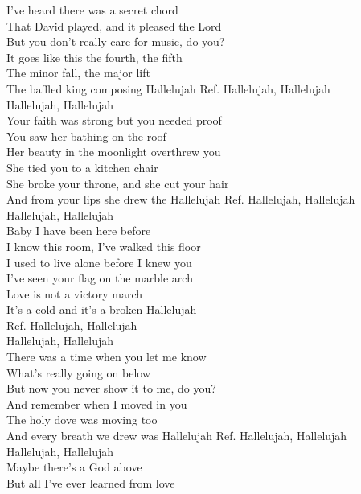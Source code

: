 
I've heard there was a secret chord\\
That David played, and it pleased the Lord\\
But you don't really care for music, do you?\\
It goes like this the fourth, the fifth\\
The minor fall, the major lift\\
The baffled king composing Hallelujah
\hops
Ref. Hallelujah, Hallelujah\\
 Hallelujah, Hallelujah\\
\hops
Your faith was strong but you needed proof\\
You saw her bathing on the roof\\
Her beauty in the moonlight overthrew you\\
She tied you to a kitchen chair\\
She broke your throne, and she cut your hair\\
And from your lips she drew the Hallelujah
\hops
Ref. Hallelujah, Hallelujah\\
 Hallelujah, Hallelujah\\
\hops
Baby I have been here before\\
I know this room, I've walked this floor\\
I used to live alone before I knew you\\
I've seen your flag on the marble arch\\
Love is not a victory march\\
It's a cold and it's a broken Hallelujah\\
\hops
Ref. Hallelujah, Hallelujah\\
 Hallelujah, Hallelujah\\
\hops
There was a time when you let me know\\
What's really going on below\\
But now you never show it to me, do you?\\
And remember when I moved in you\\
The holy dove was moving too\\
And every breath we drew was Hallelujah
\hops
Ref. Hallelujah, Hallelujah\\
 Hallelujah, Hallelujah\\
\hops
Maybe there’s a God above\\
But all I’ve ever learned from love\\
